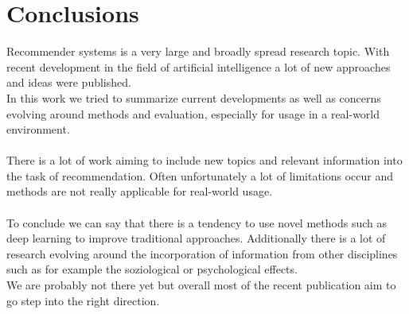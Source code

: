 \documentclass[runningheads,a4paper]{llncs}
\begin{document}
\section{Conclusions}
Recommender systems is a very large and broadly spread research topic.
With recent development in the field of artificial intelligence a lot of new approaches and ideas were published.\\
In this work we tried to summarize current developments as well as concerns evolving around methods and evaluation, especially 
for usage in a real-world environment.\\
\\
There is a lot of work aiming to include new topics and relevant information into the task of recommendation. 
Often unfortunately a lot of limitations occur and methods are not really applicable for real-world usage. \\
\\
To conclude we can say that there is a tendency to use novel methods such as deep learning to improve traditional approaches.
Additionally there is a lot of research evolving around the incorporation of information from other disciplines such as 
for example the soziological or psychological effects. \\
We are probably not there yet but overall most of the recent publication aim to go step into the right direction. 
\newpage
\end{document}
